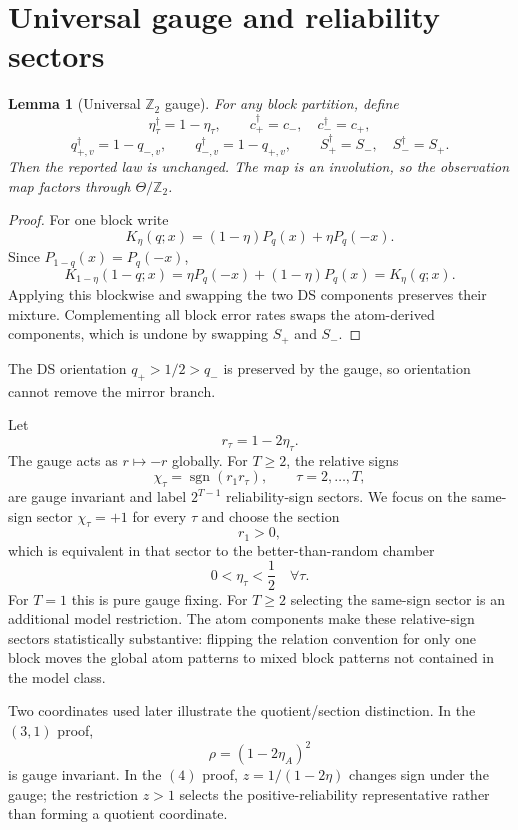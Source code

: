 \documentclass[11pt]{article}
\newtheorem{lemma}[theorem]{Lemma}
\theoremstyle{definition}
\theoremstyle{remark}
\newcommand{\Ztwo}{\mathbb{Z}_2}
\begin{document}
\section{Universal gauge and reliability sectors}
\label{sec:gauge}

\begin{lemma}[Universal $\Ztwo$ gauge]
\label{lem:gauge}
For any block partition, define
\[
\eta_\tau^\dagger=1-\eta_\tau,\qquad
c_+^\dagger=c_-,\quad c_-^\dagger=c_+,
\]
\[
q_{+,v}^\dagger=1-q_{-,v},\qquad q_{-,v}^\dagger=1-q_{+,v},
\qquad
S_+^\dagger=S_-,\quad S_-^\dagger=S_+.
\]
Then the reported law is unchanged. The map is an involution, so the observation map factors through $\Theta/\Ztwo$.
\end{lemma}
\begin{proof}
For one block write
\[
K_\eta(q;x)=(1-\eta)P_q(x)+\eta P_q(-x).
\]
Since $P_{1-q}(x)=P_q(-x)$,
\[
K_{1-\eta}(1-q;x)=\eta P_q(-x)+(1-\eta)P_q(x)=K_\eta(q;x).
\]
Applying this blockwise and swapping the two DS components preserves their mixture. Complementing all block error rates swaps the atom-derived components, which is undone by swapping $S_+$ and $S_-$.\qedhere
\end{proof}

The DS orientation $q_+>1/2>q_-$ is preserved by the gauge, so orientation cannot remove the mirror branch.

Let
\[
r_\tau=1-2\eta_\tau.
\]
The gauge acts as $r\mapsto-r$ globally. For $T\ge2$, the relative signs
\[
\chi_\tau=\operatorname{sgn}(r_1r_\tau),\qquad \tau=2,\ldots,T,
\]
are gauge invariant and label $2^{T-1}$ reliability-sign sectors. We focus on the same-sign sector $\chi_\tau=+1$ for every $\tau$ and choose the section
\[
r_1>0,
\]
which is equivalent in that sector to the better-than-random chamber
\[
0<\eta_\tau<\frac12\quad\forall\tau.
\]
For $T=1$ this is pure gauge fixing. For $T\ge2$ selecting the same-sign sector is an additional model restriction. The atom components make these relative-sign sectors statistically substantive: flipping the relation convention for only one block moves the global atom patterns to mixed block patterns not contained in the model class.

Two coordinates used later illustrate the quotient/section distinction. In the $(3,1)$ proof,
\[
\rho=(1-2\eta_A)^2
\]
is gauge invariant. In the $(4)$ proof, $z=1/(1-2\eta)$ changes sign under the gauge; the restriction $z>1$ selects the positive-reliability representative rather than forming a quotient coordinate.
\end{document}
